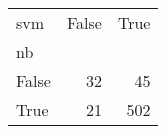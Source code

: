 \begin{tabular}{lrr}
\toprule
svm &  False &  True  \\
nb    &        &        \\
\midrule
False &     32 &     45 \\
True  &     21 &    502 \\
\bottomrule
\end{tabular}
